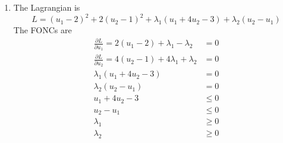 \documentclass[letterpaper,12pt,titlepage]{article}
\newcommand*\pder[2]{\frac{\partial #1}{\partial #2}}
\begin{document}
\begin{enumerate}[leftmargin=0pt]
\item The Lagrangian is
  \[ L = (u_1-2)^2 + 2(u_2-1)^2 + \lambda_1(u_1+4u_2-3) + \lambda_2(u_2-u_1) \]
  The FONCs are
  \begin{align}
    \pder{L}{u_1} = 2(u_1-2) + \lambda_1 - \lambda_2 &= 0 \\
    \pder{L}{u_2} = 4(u_2-1) + 4\lambda_1 + \lambda_2 &= 0\\
    \lambda_1(u_1+4u_2-3) &= 0 \\
    \lambda_2(u_2-u_1) &= 0 \\
    u_1+4u_2-3 &\le 0 \\
    u_2-u_1 &\le 0 \\
    \lambda_1 &\ge 0 \\
    \lambda_2 &\ge 0
  \end{align}


\end{enumerate}
\end{document}
